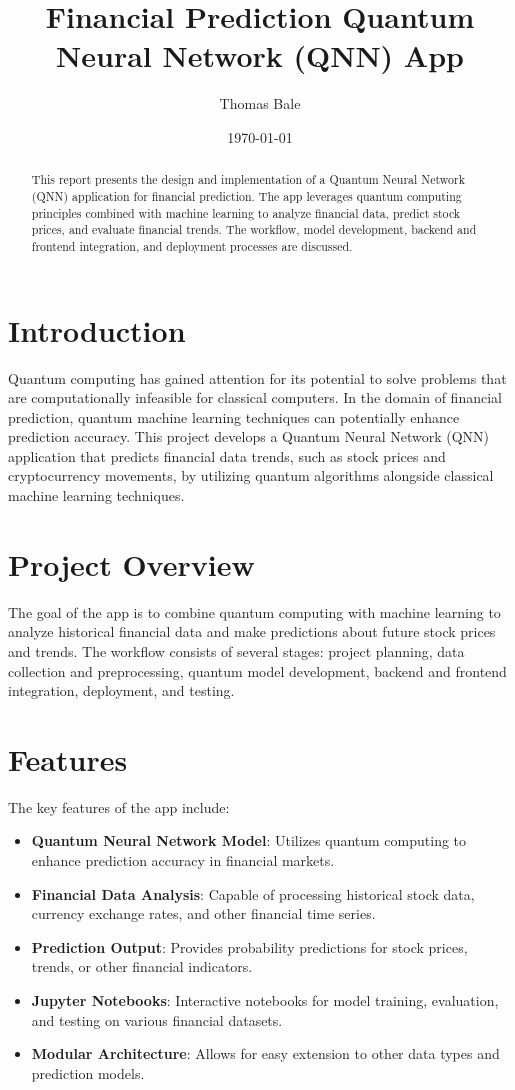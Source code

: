 \documentclass[12pt]{article}
\title{Financial Prediction Quantum Neural Network (QNN) App}
\author{Thomas Bale}
\date{\today}
\begin{document}
\maketitle

\begin{abstract}
This report presents the design and implementation of a Quantum Neural Network (QNN) application for financial prediction. The app leverages quantum computing principles combined with machine learning to analyze financial data, predict stock prices, and evaluate financial trends. The workflow, model development, backend and frontend integration, and deployment processes are discussed.
\end{abstract}

\begin{multicols}{2}

\section{Introduction}
Quantum computing has gained attention for its potential to solve problems that are computationally infeasible for classical computers. In the domain of financial prediction, quantum machine learning techniques can potentially enhance prediction accuracy. This project develops a Quantum Neural Network (QNN) application that predicts financial data trends, such as stock prices and cryptocurrency movements, by utilizing quantum algorithms alongside classical machine learning techniques.

\section{Project Overview}
The goal of the app is to combine quantum computing with machine learning to analyze historical financial data and make predictions about future stock prices and trends. The workflow consists of several stages: project planning, data collection and preprocessing, quantum model development, backend and frontend integration, deployment, and testing.

\section{Features}
The key features of the app include:
\begin{itemize}
    \item \textbf{Quantum Neural Network Model}: Utilizes quantum computing to enhance prediction accuracy in financial markets.
    \item \textbf{Financial Data Analysis}: Capable of processing historical stock data, currency exchange rates, and other financial time series.
    \item \textbf{Prediction Output}: Provides probability predictions for stock prices, trends, or other financial indicators.
    \item \textbf{Jupyter Notebooks}: Interactive notebooks for model training, evaluation, and testing on various financial datasets.
    \item \textbf{Modular Architecture}: Allows for easy extension to other data types and prediction models.
\end{itemize}


\end{multicols}
\end{document}
